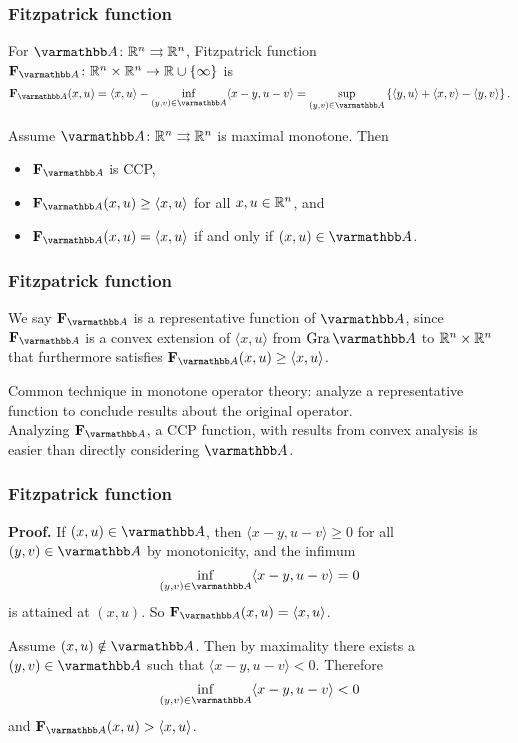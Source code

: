 \documentclass[10pt,mathserif]{beamer}
\begin{document}
\begin{frame}
\frametitle{Fitzpatrick function}
For $\opA\colon\reals^n\rightrightarrows \reals^n$, Fitzpatrick function $\fitzpatrick_\opA\colon\reals^n\times\reals^n\rightarrow\reals\cup\{\infty\}$ is
\[
\fitzpatrick_\opA(x,u)=\langle x,u\rangle -\inf_{(y,v)\in \opA}\langle x-y,u-v\rangle
=\sup_{(y,v)\in \opA}\left\{\langle y,u\rangle+\langle x,v\rangle-\langle y,v\rangle\right\}.
\]

\setcounter{theorem}{2}
\begin{lemma}
\label{lem:fitzpatrick-properties}
Assume $\opA\colon\reals^n\rightrightarrows \reals^n$ is maximal monotone.
Then 
\begin{itemize}
    \item $\fitzpatrick_\opA$ is CCP,
    \item $\fitzpatrick_\opA(x,u)\ge \langle x,u\rangle$ for all $x,u\in \mathbb{R}^n$, and
    \item $\fitzpatrick_\opA(x,u)=\langle x,u\rangle$ if and only if $(x,u)\in \opA$.
\end{itemize}
\end{lemma}
\end{frame}

\begin{frame}
\frametitle{Fitzpatrick function}
We say $\fitzpatrick_\opA$ is a representative function of $\opA$, since $\fitzpatrick_\opA$ is a convex extension of  $\langle x,u\rangle $ from $\gra \opA $ to $\mathbb{R}^n\times \mathbb{R}^n$ that furthermore satisfies $\fitzpatrick_\opA(x,u)\ge \langle x,u\rangle$.



\vspace{0.2in}
Common technique in monotone operator theory:
analyze a representative function to conclude results about the original operator.\\
Analyzing $\fitzpatrick_\opA$, a CCP function, with results from convex analysis is easier than directly considering $\opA$.
\end{frame}

\begin{frame}
\frametitle{Fitzpatrick function}
\textbf{Proof.}
If $(x,u)\in \opA$, then
$\langle x-y,u-v\rangle\ge 0$
for all $(y,v)\in \opA$ by monotonicity,
and the infimum
\[
\inf_{(y,v)\in \opA}\langle x-y,u-v\rangle=0
\]
is attained at $(x,u)$.
So $\fitzpatrick_\opA(x,u)=\langle x,u\rangle$.
\vspace{0.2in}

Assume $(x,u)\notin \opA$. Then by maximality there exists a $(y,v)\in \opA$ such that 
$\langle x-y,u-v\rangle<0$.
Therefore
\[
\inf_{(y,v)\in \opA}\langle x-y,u-v\rangle<0
\]
and $\fitzpatrick_\opA(x,u)>\langle x,u\rangle$.
\end{frame}
\end{document}
